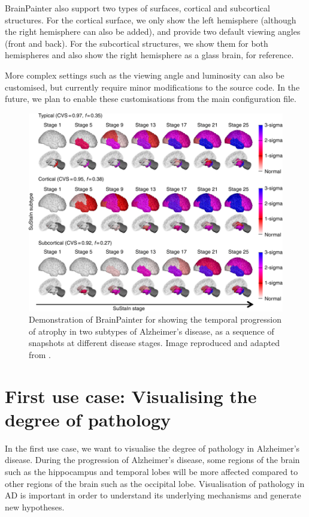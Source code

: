 \documentclass{llncs}
\begin{document}
BrainPainter also support two types of surfaces, cortical and subcortical structures. For the cortical surface, we only show the left hemisphere (although the right hemisphere can also be added), and provide two default viewing angles (front and back). For the subcortical structures, we show them for both hemispheres and also show the right hemisphere as a glass brain, for reference.

More complex settings such as the viewing angle and luminosity can also be customised, but currently require minor modifications to the source code. In the future, we plan to enable these customisations from the main configuration file.
 

\begin{figure}[htp]
\centering
 \includegraphics[width=1\textwidth, trim=20 0 0 220, clip]{images/young_progression.png}
 \caption{Demonstration of BrainPainter for showing the temporal progression of atrophy in two subtypes of Alzheimer's disease, as a sequence of snapshots at different disease stages. Image reproduced and adapted from \cite{young2018uncovering}.}
  \label{fig:youngProg}
\end{figure}

\section{First use case: Visualising the degree of pathology}
\label{degree}

In the first use case, we want to visualise the degree of pathology in Alzheimer's disease. During the progression of Alzheimer's disease, some regions of the brain such as the hippocampus and temporal lobes will be more affected compared to other regions of the brain such as the occipital lobe. Visualisation of pathology in AD is important in order to understand its underlying mechanisms and generate new hypotheses. 
\end{document}
